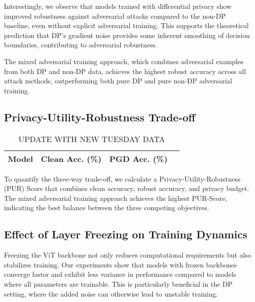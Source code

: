 \documentclass[11pt, conference]{IEEEtran}
\begin{document}
Interestingly, we observe that models trained with differential privacy show improved robustness against adversarial attacks compared to the non-DP baseline, even without explicit adversarial training. This supports the theoretical prediction that DP's gradient noise provides some inherent smoothing of decision boundaries, contributing to adversarial robustness.

The mixed adversarial training approach, which combines adversarial examples from both DP and non-DP data, achieves the highest robust accuracy across all attack methods, outperforming both pure DP and pure non-DP adversarial training.

\subsection{Privacy-Utility-Robustness Trade-off}

\begin{table}[H]
    \centering
    \begin{tabular}{lccc}
        \toprule
        \textbf{Model} & \textbf{Clean Acc. (\%)} & \textbf{PGD Acc. (\%)} } \\
        \midrule
    \end{tabular}
    \caption{UPDATE WITH NEW TUESDAY DATA}
    \label{tab:pur_score}
\end{table}

To quantify the three-way trade-off, we calculate a Privacy-Utility-Robustness (PUR) Score that combines clean accuracy, robust accuracy, and privacy budget. The mixed adversarial training approach achieves the highest PUR-Score, indicating the best balance between the three competing objectives.

\subsection{Effect of Layer Freezing on Training Dynamics}

Freezing the ViT backbone not only reduces computational requirements but also stabilizes training. Our experiments show that models with frozen backbones converge faster and exhibit less variance in performance compared to models where all parameters are trainable. This is particularly beneficial in the DP setting, where the added noise can otherwise lead to unstable training.
\end{document}
